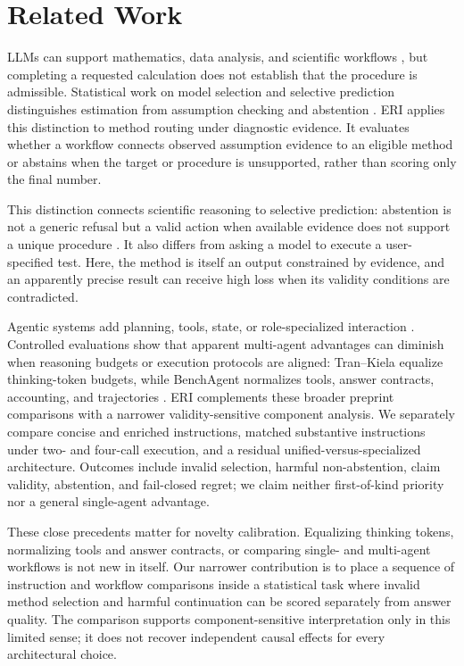 \section{Related Work}
\label{sec:related-work}

LLMs can support mathematics, data analysis, and scientific workflows
\citep{GuEtAl2024BLADE,LiuEtAl2024QRData}, but completing a requested
calculation does not establish that the procedure is admissible.  Statistical
work on model selection and selective prediction distinguishes estimation
from assumption checking and abstention
\citep{LeebPotscher2005,Chow1970Reject}.  ERI applies this distinction to
method routing under diagnostic evidence.  It evaluates whether a workflow
connects observed assumption evidence to an eligible method or abstains when
the target or procedure is unsupported, rather than scoring only the final
number.

This distinction connects scientific reasoning to selective prediction:
abstention is not a generic refusal but a valid action when available evidence
does not support a unique procedure \citep{Chow1970Reject}.  It also differs
from asking a model to execute a user-specified test.  Here, the method is
itself an output constrained by evidence, and an apparently precise result can
receive high loss when its validity conditions are contradicted.

Agentic systems add planning, tools, state, or role-specialized interaction
\citep{YaoEtAl2023ReAct,HongEtAl2024MetaGPT}.  Controlled evaluations show
that apparent multi-agent advantages can diminish when reasoning budgets or
execution protocols are aligned: Tran--Kiela equalize thinking-token budgets,
while BenchAgent normalizes tools, answer contracts, accounting, and
trajectories \citep{TranKiela2026,FuEtAl2026BenchAgent}.  ERI complements
these broader preprint comparisons with a narrower validity-sensitive
component analysis.  We separately compare concise and enriched instructions,
matched substantive instructions under two- and four-call execution, and a
residual unified-versus-specialized architecture.  Outcomes include invalid
selection, harmful non-abstention, claim validity, abstention, and fail-closed
regret; we claim neither first-of-kind priority nor a general single-agent
advantage.

These close precedents matter for novelty calibration.  Equalizing thinking
tokens, normalizing tools and answer contracts, or comparing single- and
multi-agent workflows is not new in itself.  Our narrower contribution is to
place a sequence of instruction and workflow comparisons inside a statistical
task where invalid method selection and harmful continuation can be scored
separately from answer quality.  The comparison supports component-sensitive
interpretation only in this limited sense; it does not recover independent
causal effects for every architectural choice.

